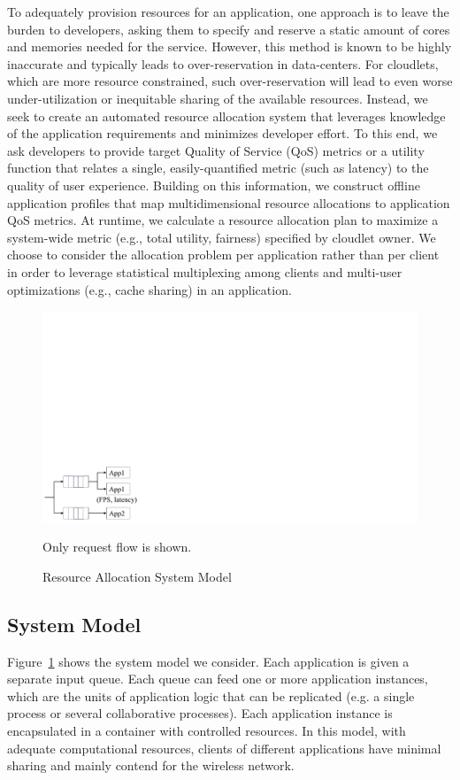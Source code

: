 To adequately provision resources for an application, one approach is
to leave the burden to developers, asking them to specify and reserve
a static amount of cores and memories needed for the service. However,
this method is known to be highly inaccurate and typically leads to
over-reservation in data-centers. For cloudlets, which are more
resource constrained, such over-reservation will lead to even worse
under-utilization or inequitable sharing of the available resources.
Instead, we seek to create an automated resource allocation system
that leverages knowledge of the application requirements and minimizes
developer effort.  To this end, we ask developers to provide target
Quality of Service (QoS) metrics or a utility function that relates a
single, easily-quantified metric (such as latency) to the quality of
user experience.  Building on this information, we construct offline
application profiles that map multidimensional resource allocations to
application QoS metrics.  At runtime, we calculate a resource
allocation plan to maximize a system-wide metric (e.g., total utility,
fairness) specified by cloudlet owner. We choose to consider the
allocation problem per application rather than per client in order to
leverage statistical multiplexing among clients and multi-user
optimizations (e.g., cache sharing) in an application.

\begin{figure}
\centering
\includegraphics[width=0.5\linewidth]{FIGS/fig-allocation-system-model-cropped.pdf}
\begin{captiontext}Only request flow is shown.\end{captiontext}
\caption{Resource Allocation System Model}
\label{fig:allocation-system-model}
\vspace{-0.2in}
\end{figure}

\subsection{System Model}
Figure~\ref{fig:allocation-system-model} shows the system model we consider.
Each application is given a separate input queue. Each queue can feed one or
more application instances, which are the units of application logic that can be
replicated (e.g. a single process or several collaborative processes). Each
application instance is encapsulated in a container with controlled resources.
In this model, with adequate computational resources, clients of different
applications have minimal sharing and mainly contend for the wireless network.

